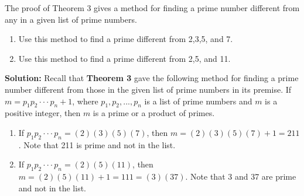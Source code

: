 The proof of Theorem 3 gives a method for finding a prime number different from any in a given list of prime numbers.

\begin{enumerate}[label=(\alph*)]
    \item Use this method to find a prime different from 2,3,5, and 7.
    \item Use this method to find a prime different from 2,5, and 11.
\end{enumerate}

\textbf{Solution:}
Recall that \textbf{Theorem 3} gave the following method for finding a prime number different from those in the given list of prime numbers in its premise. If $m=p_1p_2\cdot \cdot \cdot p_n+1$, where $p_1,p_2,..., p_n$ is a list of prime numbers and $m$ is a positive integer, then $m$ is a prime or a product of primes.
\begin{enumerate}[label=(\alph*)]
   \item If $p_1p_2\cdot \cdot \cdot p_n = (2)(3)(5)(7) $, then $m=(2)(3)(5)(7)+1=211$. Note that 211 is prime and not in the list.
   \item If $p_1p_2\cdot \cdot \cdot p_n = (2)(5)(11) $, then $m=(2)(5)(11)+1=111=(3)(37)$. Note that 3 and 37 are prime and not in the list.
\end{enumerate}

\pagebreak